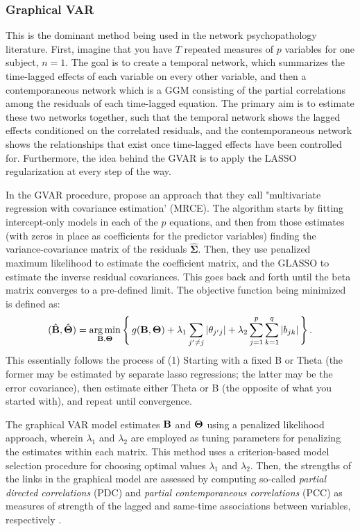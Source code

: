 \subsubsection{Graphical VAR}
This is the dominant method being used in the network psychopathology literature. First, imagine that you have $T$ repeated measures of $p$ variables for one subject, $n = 1$. The goal is to create a temporal network, which summarizes the time-lagged effects of each variable on every other variable, and then a contemporaneous network which is a GGM consisting of the partial correlations among the residuals of each time-lagged equation. The primary aim is to estimate these two networks together, such that the temporal network shows the lagged effects conditioned on the correlated residuals, and the contemporaneous network shows the relationships that exist once time-lagged effects have been controlled for. Furthermore, the idea behind the GVAR is to apply the LASSO regularization at every step of the way.

In the GVAR procedure, \cite{rothman2010sparse} propose an approach that they call "multivariate regression with covariance estimation' (MRCE). The algorithm starts by fitting intercept-only models in each of the $p$ equations, and then from those estimates (with zeros in place as coefficients for the predictor variables) finding the variance-covariance matrix of the residuals $\hat{\bm{\Sigma}}$. Then, they use penalized maximum likelihood to estimate the coefficient matrix, and the GLASSO to estimate the inverse residual covariances. This goes back and forth until the beta matrix converges to a pre-defined limit. The objective function being minimized is defined as:
\begin{equation}
    (\hat{\mathbf{B}}, \hat{\bm{\Theta}}) = \operatorname*{arg\,min}_{\mathbf{B},\bm{\Theta}} \operatorname{\Bigg\{} g(\mathbf{B},\bm{\Theta}) + \lambda_1 \sum_{j' \neq j}|\theta_{j'j}| + \lambda_2 \sum_{j = 1}^p \sum_{k = 1}^q |b_{jk}| \operatorname{\Bigg\}}.
\end{equation}
This essentially follows the process of (1) Starting with a fixed B or Theta (the former may be estimated by separate lasso regressions; the latter may be the error covariance), then estimate either Theta or B (the opposite of what you started with), and repeat until convergence. 

The graphical VAR model estimates $\mathbf{B}$ and $\bm{\Theta}$ using a penalized likelihood approach, wherein $\lambda_1$ and $\lambda_2$ are employed as tuning parameters for penalizing the estimates within each matrix. This method uses a criterion-based model selection procedure for choosing optimal values $\lambda_1$ and $\lambda_2$. Then, the strengths of the links in the graphical model are assessed by computing so-called \textit{partial directed correlations} (PDC) and \textit{partial contemporaneous correlations} (PCC) as measures of strength of the lagged and same-time associations between variables, respectively \cite{wild2010graphical}. 

